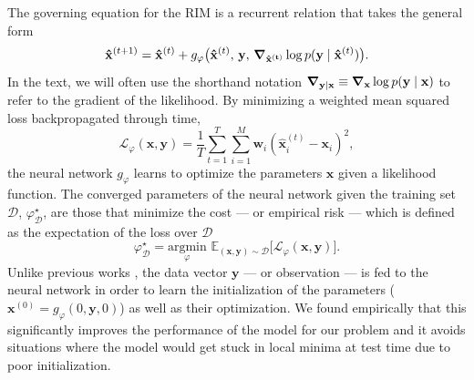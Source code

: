 The governing equation for the RIM is a recurrent 
relation that takes the general form
\begin{equation}\label{eq:RIM}
        \mathbf{\hat{x}}^{(t+1)} = \mathbf{\hat{x}}^{(t)} 
        + g_\varphi \big(\mathbf{\hat{x}}^{(t)},\, \mathbf{y},\, 
\grad_{\mathbf{\hat{x}^{(t)}}} \log p(\mathbf{y} \mid \mathbf{\hat{x}}^{(t)})\big).
\end{equation}
In the text, we will often use the shorthand notation ${\grad_{\mathbf{y} \mid \mathbf{x}} \equiv 
\grad_{\mathbf{x}} \log p(\mathbf{y} \mid \mathbf{x})}$
to refer to the gradient of the likelihood.
By minimizing a weighted mean squared loss backpropagated 
through time, 
\begin{equation}\label{eq:Loss}
		\mathcal{L}_\varphi(\mathbf{x}, \mathbf{y}) = 
		\frac{1}{T}\sum_{t=1}^{T}\sum_{i=1}^{M} \mathbf{w}_i (\mathbf{\hat{x}}^{(t)}_i - \mathbf{x}_i)^2,
\end{equation} 
the neural network $g_\varphi$ learns to optimize the 
parameters $\mathbf{x}$ given a likelihood function. 
The converged parameters of the neural network given the training set $\mathcal{D}$, 
$\varphi^{\star}_{\mathcal{D}}$, are those that minimize the cost --- or empirical risk --- 
which is defined as the 
expectation of the loss over $\mathcal{D}$
\begin{equation}\label{eq:Cost} 
		\varphi^{\star}_{\mathcal{D}} = \underset{\varphi}{\text{argmin}}\,\,
		\mathbb{E}_{(\mathbf{x},\mathbf{y}) \sim \mathcal{D}}\big[
		\mathcal{L}_\varphi(\mathbf{x}, \mathbf{y}) \big].
\end{equation} 
Unlike previous works 
\citep{Andrychowicz2016,Putzky2017,Morningstar2018,Morningstar2019,Lonning2019}, 
the data vector $\mathbf{y}$ --- or observation --- 
is fed to the neural network in order to learn 
the initialization of the parameters ($\mathbf{x}^{(0)} = g_\varphi(0, \mathbf{y}, 0)$) 
as well as their optimization. 
We found empirically that this significantly improves the performance 
of the model for our problem and it avoids situations where 
the model would get stuck in local minima at 
test time due to poor initialization. 
